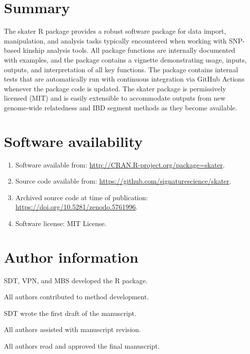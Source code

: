 \documentclass[9pt,a4paper,]{extarticle}
\begin{document}
\hypertarget{summary}{%
\section{Summary}\label{summary}}

The skater R package provides a robust software package for data import, manipulation, and analysis tasks typically encountered when working with SNP-based kinship analysis tools. All package functions are internally documented with examples, and the package contains a vignette demonstrating usage, inputs, outputs, and interpretation of all key functions. The package contains internal tests that are automatically run with continuous integration via GitHub Actions whenever the package code is updated. The skater package is permissively licensed (MIT) and is easily extensible to accommodate outputs from new genome-wide relatedness and IBD segment methods as they become available.

\hypertarget{software-availability}{%
\section{Software availability}\label{software-availability}}

\begin{enumerate}
\def\labelenumi{\arabic{enumi}.}
\item
  Software available from: \url{http://CRAN.R-project.org/package=skater}.
\item
  Source code available from: \url{https://github.com/signaturescience/skater}.
\item
  Archived source code at time of publication: \url{https://doi.org/10.5281/zenodo.5761996}.
\item
  Software license: MIT License.
\end{enumerate}

\hypertarget{author-information}{%
\section{Author information}\label{author-information}}

SDT, VPN, and MBS developed the R package.

All authors contributed to method development.

SDT wrote the first draft of the manuscript.

All authors assisted with manuscript revision.

All authors read and approved the final manuscript.
\end{document}
